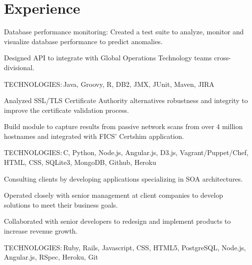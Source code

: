 \documentclass[]{cls}
\def\kt{\vspace*{2pt}\textsc{TECHNOLOGIES:\,}}
\begin{document}
\begin{minipage}[t]{0.66\textwidth} 


\section{Experience}
\sectionsep

\vspace{\topsep}
\begin{tightemize}
\item Database performance monitoring: Created a test suite to analyze, monitor and visualize database performance to predict anomalies. 
\item Designed API to integrate with Global Operations Technology teams cross-divisional.
\end{tightemize}
\kt Java, Groovy, R, DB2, JMX, JUnit, Maven, JIRA

\sectionsep


\begin{tightemize}
\item Analyzed SSL/TLS Certificate Authority alternatives robustness and integrity to improve the certificate validation process.
\item Build module to capture results from passive network scans from over 4 million hostnames and integrated with FICS' Certshim application.
\end{tightemize}
\kt C, Python, Node.js, Angular.js, D3.js, Vagrant/Puppet/Chef, HTML, CSS, SQLite3, MongoDB, Github, Heroku

\sectionsep

\begin{tightemize}
\item Consulting clients by developing applications specializing in SOA architectures. 
\item Operated closely with senior management at client companies to develop solutions to meet their business goals.
\item Collaborated with senior developers to redesign and implement products to increase revenue growth.
\end{tightemize}
\kt Ruby, Rails, Javascript, CSS, HTML5, PostgreSQL, Node.js, Angular.js, RSpec, Heroku, Git


\end{minipage}
\end{document}
